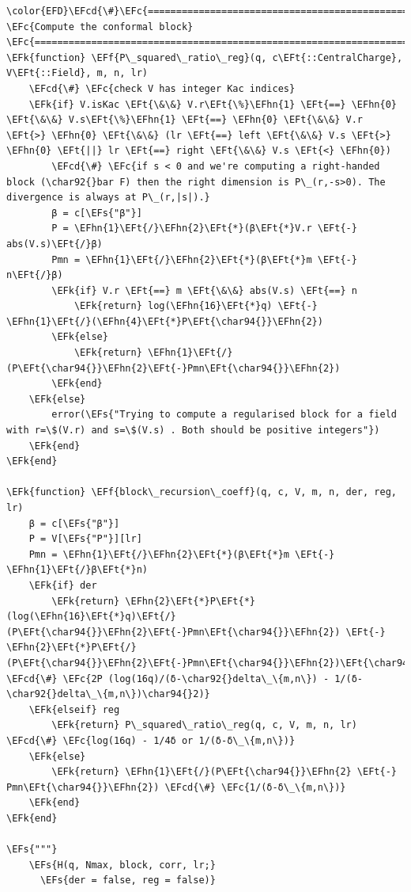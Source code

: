 \documentclass[a4paper]{article}
\numberwithin{equation}{section}
\newcommand{\EFc}[1]{\textcolor{EFc}{#1}} %
\newcommand{\EFcd}[1]{\textcolor{EFcd}{#1}} %
\newcommand{\EFs}[1]{\textcolor{EFs}{#1}} %
\newcommand{\EFk}[1]{\textcolor{EFk}{#1}} %
\newcommand{\EFf}[1]{\textcolor{EFf}{#1}} %
\newcommand{\EFt}[1]{\textcolor{EFt}{#1}} %
\newcommand{\EFhn}[1]{\textcolor{EFhn}{#1}} %
\begin{document}
\begin{Code}
\begin{Verbatim}
\color{EFD}\EFcd{\#}\EFc{===========================================================================================}
\EFc{Compute the conformal block}
\EFc{===========================================================================================\#}
\EFk{function} \EFf{P\_squared\_ratio\_reg}(q, c\EFt{::CentralCharge}, V\EFt{::Field}, m, n, lr)
    \EFcd{\#} \EFc{check V has integer Kac indices}
    \EFk{if} V.isKac \EFt{\&\&} V.r\EFt{\%}\EFhn{1} \EFt{==} \EFhn{0} \EFt{\&\&} V.s\EFt{\%}\EFhn{1} \EFt{==} \EFhn{0} \EFt{\&\&} V.r \EFt{>} \EFhn{0} \EFt{\&\&} (lr \EFt{==} left \EFt{\&\&} V.s \EFt{>} \EFhn{0} \EFt{||} lr \EFt{==} right \EFt{\&\&} V.s \EFt{<} \EFhn{0})
        \EFcd{\#} \EFc{if s < 0 and we're computing a right-handed block (\char92{}bar F) then the right dimension is P\_(r,-s>0). The divergence is always at P\_(r,|s|).}
        β = c[\EFs{"β"}]
        P = \EFhn{1}\EFt{/}\EFhn{2}\EFt{*}(β\EFt{*}V.r \EFt{-} abs(V.s)\EFt{/}β)
        Pmn = \EFhn{1}\EFt{/}\EFhn{2}\EFt{*}(β\EFt{*}m \EFt{-} n\EFt{/}β)
        \EFk{if} V.r \EFt{==} m \EFt{\&\&} abs(V.s) \EFt{==} n
            \EFk{return} log(\EFhn{16}\EFt{*}q) \EFt{-} \EFhn{1}\EFt{/}(\EFhn{4}\EFt{*}P\EFt{\char94{}}\EFhn{2})
        \EFk{else}
            \EFk{return} \EFhn{1}\EFt{/}(P\EFt{\char94{}}\EFhn{2}\EFt{-}Pmn\EFt{\char94{}}\EFhn{2})
        \EFk{end}
    \EFk{else}
        error(\EFs{"Trying to compute a regularised block for a field with r=\$(V.r) and s=\$(V.s) . Both should be positive integers"})
    \EFk{end}
\EFk{end}

\EFk{function} \EFf{block\_recursion\_coeff}(q, c, V, m, n, der, reg, lr)
    β = c[\EFs{"β"}]
    P = V[\EFs{"P"}][lr]
    Pmn = \EFhn{1}\EFt{/}\EFhn{2}\EFt{*}(β\EFt{*}m \EFt{-} \EFhn{1}\EFt{/}β\EFt{*}n)
    \EFk{if} der
        \EFk{return} \EFhn{2}\EFt{*}P\EFt{*}(log(\EFhn{16}\EFt{*}q)\EFt{/}(P\EFt{\char94{}}\EFhn{2}\EFt{-}Pmn\EFt{\char94{}}\EFhn{2}) \EFt{-} \EFhn{2}\EFt{*}P\EFt{/}(P\EFt{\char94{}}\EFhn{2}\EFt{-}Pmn\EFt{\char94{}}\EFhn{2})\EFt{\char94{}}\EFhn{2}) \EFcd{\#} \EFc{2P (log(16q)/(δ-\char92{}delta\_\{m,n\}) - 1/(δ-\char92{}delta\_\{m,n\})\char94{}2)}
    \EFk{elseif} reg
        \EFk{return} P\_squared\_ratio\_reg(q, c, V, m, n, lr) \EFcd{\#} \EFc{log(16q) - 1/4δ or 1/(δ-δ\_\{m,n\})}
    \EFk{else}
        \EFk{return} \EFhn{1}\EFt{/}(P\EFt{\char94{}}\EFhn{2} \EFt{-} Pmn\EFt{\char94{}}\EFhn{2}) \EFcd{\#} \EFc{1/(δ-δ\_\{m,n\})}
    \EFk{end}
\EFk{end}

\EFs{"""}
    \EFs{H(q, Nmax, block, corr, lr;}
      \EFs{der = false, reg = false)}


\end{Verbatim}
\end{Code}
\end{document}
